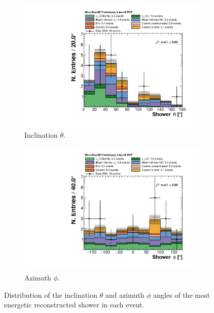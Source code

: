 \begin{figure}[htbp]
\centering
  \begin{subfigure}{0.45\textwidth}
    \includegraphics[width=\linewidth]{figures/h_shower_theta_after.pdf}
    \caption{Inclination $\theta$.} 
  \end{subfigure}
    \begin{subfigure}{0.45\textwidth}
    \includegraphics[width=\linewidth]{figures/h_shower_phi_after.pdf}
    \caption{Azimuth $\phi$.} 
  \end{subfigure}
  \caption{Distribution of the inclination $\theta$ and azimuth $\phi$ angles of the most energetic reconstructed shower in each event.}\label{fig:showerangles}
\end{figure}


